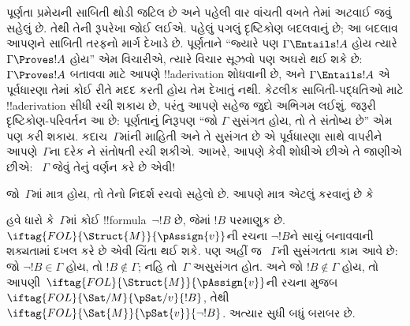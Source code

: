\documentclass[../../../include/open-logic-section]{subfiles}
\begin{document}
      {}
      {}


પૂર્ણતા પ્રમેયની સાબિતી થોડી જટિલ છે અને પહેલી વાર વાંચતી વખતે તેમાં
અટવાઈ જવું સહેલું છે. તેથી તેની રૂપરેખા જોઈ લઈએ. પહેલું પગલું
દૃષ્ટિકોણ બદલવાનું છે; આ બદલાવ આપણને સાબિતી તરફનો માર્ગ દેખાડે છે.
પૂર્ણતાને ``જ્યારે પણ $\Gamma \Entails !A$ હોય ત્યારે $\Gamma \Proves
!A$ હોય'' એમ વિચારીએ, ત્યારે વિચાર સૂઝવો પણ અઘરો થઈ શકે છે: $\Gamma
\Proves !A$ બતાવવા માટે આપણે !!a{derivation} શોધવાની છે, અને $\Gamma
\Entails !A$ એ પૂર્વધારણા તેમાં કોઈ રીતે મદદ કરતી હોય તેમ દેખાતું નથી.
કેટલીક સાબિતી-પદ્ધતિઓ માટે !!a{derivation} સીધી રચી શકાય છે, પરંતુ
આપણે સહેજ જુદો અભિગમ લઈશું. જરૂરી દૃષ્ટિકોણ-પરિવર્તન આ છે: પૂર્ણતાનું
નિરૂપણ ``જો $\Gamma$ સુસંગત હોય, તો તે સંતોષ્ય છે'' એમ પણ કરી શકાય.
કદાચ~$\Gamma$માંની માહિતી અને તે સુસંગત છે એ પૂર્વધારણા સાથે વાપરીને
આપણે~$\Gamma$ના દરેક ને સંતોષતી
 રચી શકીએ. આખરે, આપણે કેવી
 શોધીએ છીએ તે જાણીએ છીએ:
~$\Gamma$ જેવું તેનું વર્ણન કરે છે એવી!{}

જો~$\Gamma$માં માત્ર  હોય, તો તેનો નિદર્શ રચવો
સહેલો છે. આપણે માત્ર એટલું કરવાનું છે કે

હવે ધારો કે~$\Gamma$માં કોઈ !!{formula}~$\lnot !B$ છે, જેમાં $!B$
પરમાણુક છે. $\iftag{FOL}{\Struct{M}}{\pAssign{v}}$ની રચના $\lnot !B$ને
સાચું બનાવવાની શક્યતામાં દખલ કરે છે એવી ચિંતા થઈ શકે. પણ અહીં જ
~$\Gamma$ની સુસંગતતા કામ આવે છે: જો $\lnot !B \in \Gamma$ હોય, તો
$!B \notin \Gamma$; નહિ તો~$\Gamma$ અસુસંગત હોત. અને જો $!B \notin
\Gamma$ હોય, તો આપણી~$\iftag{FOL}{\Struct{M}}{\pAssign{v}}$ની રચના મુજબ
$\iftag{FOL}{\Sat/{M}}{\pSat/{v}}{!B}$, તેથી
$\iftag{FOL}{\Sat{M}}{\pSat{v}}{\lnot !B}$. અત્યાર સુધી બધું બરાબર છે.
\end{document}
